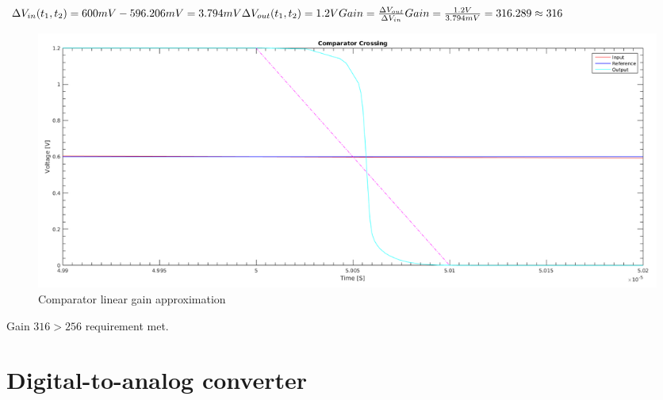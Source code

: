 \documentclass[english, 12pt, a4paper]{ifimaster}
\begin{document}
\noindent
\begin{math}
 \Delta V_{in}(t_1, t_2) = 600mV - 596.206mV = 3.794mV \\
 \Delta V_{out}(t_1, t_2) = 1.2V \\
 Gain = \frac{\Delta V_{out}}{\Delta V_{in}}\\
 Gain = \frac{1.2V}{3.794mV} = 316.289 \approx 316 \\
\end{math}

\begin{figure}[!ht]
    \centering
    \includegraphics[width=\textwidth]{img/comparator/comparator_crossing_full_with_linear_approx}
    \caption{Comparator linear gain approximation}
    \label{figure:comparator:comparator_linear_approx}
\end{figure}


Gain \( 316 > 256 \) requirement met.


\section{Digital-to-analog converter}
\end{document}
